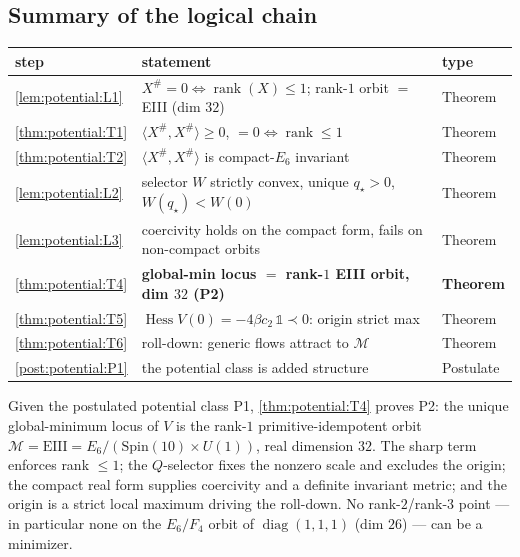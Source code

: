 \documentclass[11pt]{article}
\theoremstyle{plain}
\theoremstyle{definition}
\theoremstyle{remark}
\providecommand{\cref}[1]{\autoref{#1}}
\begin{document}
\subsection{Summary of the logical chain}
\label{sec:potential:summary}

\begin{center}
\begin{tabular}{lll}
\toprule
step & statement & type \\
\midrule
\autoref{lem:potential:L1} & $X^\#=0\iff\operatorname{rank}(X)\le1$; rank-$1$ orbit $=$ EIII (dim $32$) & Theorem \\
\autoref{thm:potential:T1} & $\langle X^\#,X^\#\rangle\ge0$, $=0\iff\operatorname{rank}\le1$ & Theorem \\
\autoref{thm:potential:T2} & $\langle X^\#,X^\#\rangle$ is compact-$E_6$ invariant & Theorem \\
\autoref{lem:potential:L2} & selector $W$ strictly convex, unique $q_\star>0$, $W(q_\star)<W(0)$ & Theorem \\
\autoref{lem:potential:L3} & coercivity holds on the compact form, fails on non-compact orbits & Theorem \\
\autoref{thm:potential:T4} & \textbf{global-min locus $=$ rank-$1$ EIII orbit, dim $32$ (P2)} & \textbf{Theorem} \\
\autoref{thm:potential:T5} & $\operatorname{Hess}V(0)=-4\beta c_2\,\mathbb1\prec0$: origin strict max & Theorem \\
\autoref{thm:potential:T6} & roll-down: generic flows attract to $\mathcal M$ & Theorem \\
\autoref{post:potential:P1} & the potential class is added structure & Postulate \\
\bottomrule
\end{tabular}
\end{center}

Given the postulated potential class P1, \autoref{thm:potential:T4} proves P2: the unique
global-minimum locus of $V$ is the rank-$1$ primitive-idempotent orbit
$\mathcal M=\mathrm{EIII}=E_6/(\mathrm{Spin}(10)\times U(1))$, real dimension $32$. The sharp
term enforces rank $\le1$; the $Q$-selector fixes the nonzero scale and excludes the origin;
the compact real form supplies coercivity and a definite invariant metric; and the origin is
a strict local maximum driving the roll-down. No rank-$2$/rank-$3$ point --- in particular
none on the $E_6/F_4$ orbit of $\operatorname{diag}(1,1,1)$ (dim $26$) --- can be a minimizer.
\end{document}
